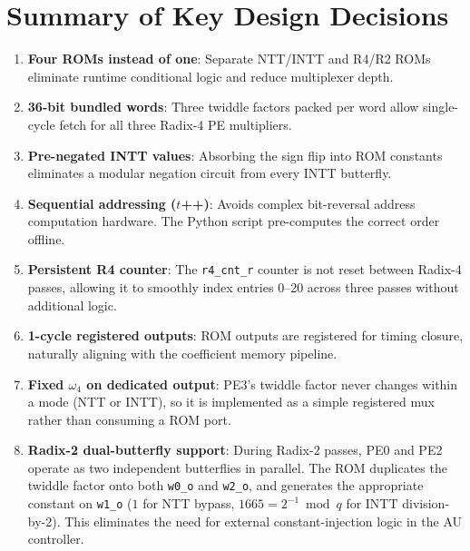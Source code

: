\documentclass[11pt,a4paper]{article}
\newcommand{\sv}[1]{\texttt{#1}}
\newcommand{\port}[1]{\texttt{#1}}
\begin{document}
\section{Summary of Key Design Decisions}
\label{sec:design-decisions}

\begin{enumerate}[label=\textbf{D\arabic*.}]
  \item \textbf{Four ROMs instead of one}: Separate NTT/INTT and R4/R2 ROMs eliminate runtime conditional logic and reduce multiplexer depth.

  \item \textbf{36-bit bundled words}: Three twiddle factors packed per word allow single-cycle fetch for all three Radix-4 PE multipliers.

  \item \textbf{Pre-negated INTT values}: Absorbing the sign flip into ROM constants eliminates a modular negation circuit from every INTT butterfly.

  \item \textbf{Sequential addressing ($t$++)}: Avoids complex bit-reversal address computation hardware. The Python script pre-computes the correct order offline.

  \item \textbf{Persistent R4 counter}: The \sv{r4\_cnt\_r} counter is not reset between Radix-4 passes, allowing it to smoothly index entries 0--20 across three passes without additional logic.

  \item \textbf{1-cycle registered outputs}: ROM outputs are registered for timing closure, naturally aligning with the coefficient memory pipeline.

  \item \textbf{Fixed $\omega_4$ on dedicated output}: PE3's twiddle factor never changes within a mode (NTT or INTT), so it is implemented as a simple registered mux rather than consuming a ROM port.

  \item \textbf{Radix-2 dual-butterfly support}: During Radix-2 passes, PE0 and PE2 operate as two independent butterflies in parallel. The ROM duplicates the twiddle factor onto both \port{w0\_o} and \port{w2\_o}, and generates the appropriate constant on \port{w1\_o} ($1$ for NTT bypass, $1665 = 2^{-1} \bmod q$ for INTT division-by-2). This eliminates the need for external constant-injection logic in the AU controller.
\end{enumerate}
\end{document}
